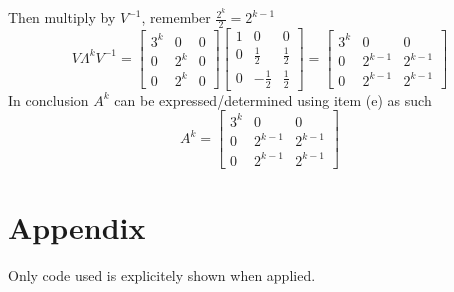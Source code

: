 \documentclass[12pt]{article}
\begin{document}
Then multiply by $V^{-1}$, remember $\frac{2^k}{2} = 2^{k-1}$
\begin{equation*}
  V\Lambda^k V^{-1}  = \begin{bmatrix}
        3^k & 0 & 0 \\
        0 & 2^k & 0 \\
        0 & 2^k & 0
    \end{bmatrix} 
    \begin{bmatrix}
        1 & 0 & 0 \\
        0 & \frac{1}{2} & \frac{1}{2} \\
        0 & -\frac{1}{2} & \frac{1}{2}
    \end{bmatrix} = 
    \begin{bmatrix}
        3^k & 0 & 0 \\
        0 & 2^{k-1} & 2^{k-1} \\
        0 & 2^{k-1} & 2^{k-1}
    \end{bmatrix}
\end{equation*}
In conclusion $A^k$ can be expressed/determined using item (e) as such
\begin{equation*}
    A^k =  \begin{bmatrix}
        3^k & 0 & 0 \\
        0 & 2^{k-1} & 2^{k-1} \\
        0 & 2^{k-1} & 2^{k-1}
    \end{bmatrix}
\end{equation*}
\section*{Appendix}
Only code used is explicitely shown when applied.
\printbibliography
\end{document}
